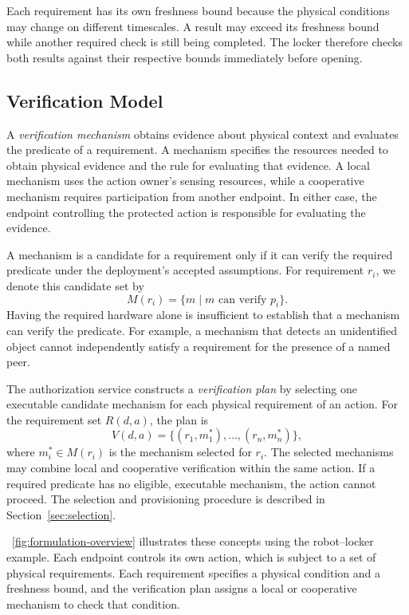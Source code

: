 \documentclass[sigconf,authordraft]{acmart}
\begin{document}
Each requirement has its own freshness bound because the physical conditions may change on different timescales.
A result may exceed its freshness bound while another required check is still being completed.
The locker therefore checks both results against their respective bounds immediately before opening.

\subsection{Verification Model}
\label{sec:verification-model}

A \emph{verification mechanism} obtains evidence about physical context and evaluates the predicate of a requirement.
A mechanism specifies the resources needed to obtain physical evidence and the rule for evaluating that evidence.
A local mechanism uses the action owner's sensing resources, while a cooperative mechanism requires participation from another endpoint.
In either case, the endpoint controlling the protected action is responsible for evaluating the evidence.

A mechanism is a candidate for a requirement only if it can verify the required predicate under the deployment's accepted assumptions.
For requirement $r_i$, we denote this candidate set by
\begin{equation}
M(r_i)=\{m\mid m\text{ can verify }p_i\}.
\end{equation}
Having the required hardware alone is insufficient to establish that a mechanism can verify the predicate.
For example, a mechanism that detects an unidentified object cannot independently satisfy a requirement for the presence of a named peer.

The authorization service constructs a \emph{verification plan} by selecting one executable candidate mechanism for each physical requirement of an action.
For the requirement set $R(d,a)$, the plan is
\begin{equation}
V(d,a)=\{(r_1,m_1^*),\ldots,(r_n,m_n^*)\},
\end{equation}
where $m_i^*\in M(r_i)$ is the mechanism selected for $r_i$.
The selected mechanisms may combine local and cooperative verification within the same action.
If a required predicate has no eligible, executable mechanism, the action cannot proceed.
The selection and provisioning procedure is described in Section~\ref{sec:selection}.

\figurename~\ref{fig:formulation-overview} illustrates these concepts using the robot--locker example.
Each endpoint controls its own action, which is subject to a set of physical requirements.
Each requirement specifies a physical condition and a freshness bound, and the verification plan assigns a local or cooperative mechanism to check that condition.
\end{document}
